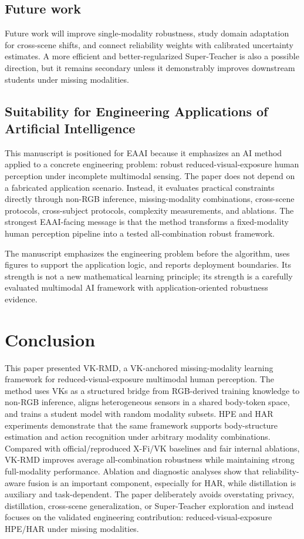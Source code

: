 \documentclass[preprint,12pt]{elsarticle}
\newcommand{\method}{VK-RMD}
\begin{document}
\subsection{Future work}

Future work will improve single-modality robustness, study domain adaptation for cross-scene shifts, and connect reliability weights with calibrated uncertainty estimates. A more efficient and better-regularized Super-Teacher is also a possible direction, but it remains secondary unless it demonstrably improves downstream students under missing modalities.

\subsection{Suitability for Engineering Applications of Artificial Intelligence}

This manuscript is positioned for EAAI because it emphasizes an AI method applied to a concrete engineering problem: robust reduced-visual-exposure human perception under incomplete multimodal sensing. The paper does not depend on a fabricated application scenario. Instead, it evaluates practical constraints directly through non-RGB inference, missing-modality combinations, cross-scene protocols, cross-subject protocols, complexity measurements, and ablations. The strongest EAAI-facing message is that the method transforms a fixed-modality human perception pipeline into a tested all-combination robust framework.

The manuscript emphasizes the engineering problem before the algorithm, uses figures to support the application logic, and reports deployment boundaries. Its strength is not a new mathematical learning principle; its strength is a carefully evaluated multimodal AI framework with application-oriented robustness evidence.

\section{Conclusion}

This paper presented \method, a VK-anchored missing-modality learning framework for reduced-visual-exposure multimodal human perception. The method uses VKs as a structured bridge from RGB-derived training knowledge to non-RGB inference, aligns heterogeneous sensors in a shared body-token space, and trains a student model with random modality subsets. HPE and HAR experiments demonstrate that the same framework supports body-structure estimation and action recognition under arbitrary modality combinations. Compared with official/reproduced X-Fi/VK baselines and fair internal ablations, \method{} improves average all-combination robustness while maintaining strong full-modality performance. Ablation and diagnostic analyses show that reliability-aware fusion is an important component, especially for HAR, while distillation is auxiliary and task-dependent. The paper deliberately avoids overstating privacy, distillation, cross-scene generalization, or Super-Teacher exploration and instead focuses on the validated engineering contribution: reduced-visual-exposure HPE/HAR under missing modalities.
\end{document}
